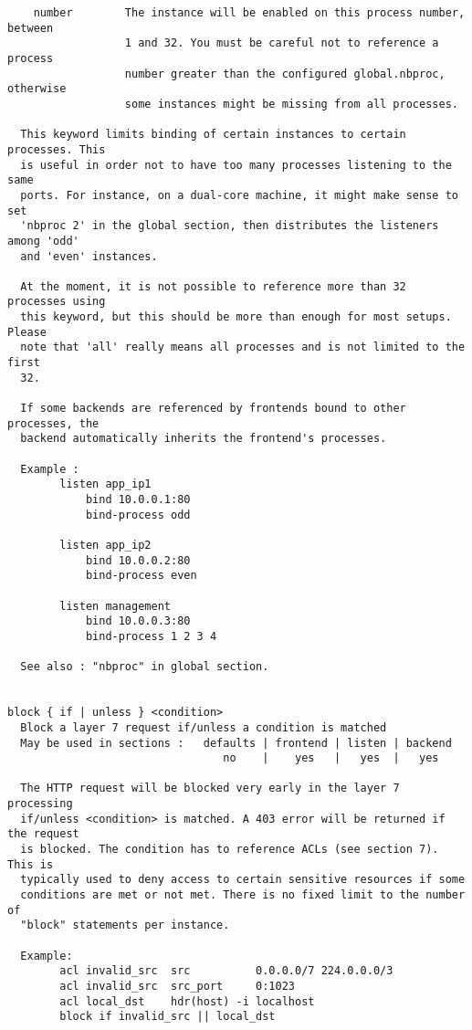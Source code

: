 \begin{verbatim}
    number        The instance will be enabled on this process number, between
                  1 and 32. You must be careful not to reference a process
                  number greater than the configured global.nbproc, otherwise
                  some instances might be missing from all processes.

  This keyword limits binding of certain instances to certain processes. This
  is useful in order not to have too many processes listening to the same
  ports. For instance, on a dual-core machine, it might make sense to set
  'nbproc 2' in the global section, then distributes the listeners among 'odd'
  and 'even' instances.

  At the moment, it is not possible to reference more than 32 processes using
  this keyword, but this should be more than enough for most setups. Please
  note that 'all' really means all processes and is not limited to the first
  32.

  If some backends are referenced by frontends bound to other processes, the
  backend automatically inherits the frontend's processes.

  Example :
        listen app_ip1
            bind 10.0.0.1:80
            bind-process odd

        listen app_ip2
            bind 10.0.0.2:80
            bind-process even

        listen management
            bind 10.0.0.3:80
            bind-process 1 2 3 4

  See also : "nbproc" in global section.


block { if | unless } <condition>
  Block a layer 7 request if/unless a condition is matched
  May be used in sections :   defaults | frontend | listen | backend
                                 no    |    yes   |   yes  |   yes

  The HTTP request will be blocked very early in the layer 7 processing
  if/unless <condition> is matched. A 403 error will be returned if the request
  is blocked. The condition has to reference ACLs (see section 7). This is
  typically used to deny access to certain sensitive resources if some
  conditions are met or not met. There is no fixed limit to the number of
  "block" statements per instance.

  Example:
        acl invalid_src  src          0.0.0.0/7 224.0.0.0/3
        acl invalid_src  src_port     0:1023
        acl local_dst    hdr(host) -i localhost
        block if invalid_src || local_dst


\end{verbatim}
